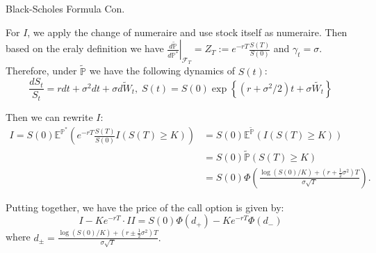 \documentclass{beamer}
\begin{document}
\begin{frame}{Black-Scholes Formula Con.}

    {\footnotesize \footnotesize
    \par For $I$, we apply the change of numeraire and use stock itself as numeraire. Then based on the eraly definition
    we have $\left.\frac{d\tilde{\mathbb{P}}}{d\mathbb{P}^*}\right|_{\mathcal{F}_T} = Z_T :=  e^{-rT}\frac{S(T)}{S(0)}$
    and $\gamma_t = \sigma$. Therefore, under \(\tilde{\mathbb{P}}\) we have the following dynamics of \(S(t)\):
    \[
    \frac{dS_t}{S_t} = rdt + \sigma^2 dt + \sigma \tilde{dW_t},\;
    S(t) = S(0) \exp \left\{ (r + \sigma^2/2) t + \sigma \tilde{W_t} \right\}
    \]
    \par Then we can rewrite $I$:
    \begin{align*}
        I = S(0)\mathbb{E}^{\mathbb{P}^*} \left( e^{-rT} \frac{S(T)}{S(0)} I(S(T) \geq K) \right) &= S(0) \mathbb{E}^{\tilde{\mathbb{P}}} (I(S(T) \geq K)) \\
        &= S(0) \tilde{\mathbb{P}}(S(T) \geq K)\\
       & = S(0) \Phi \left( \frac{\log(S(0)/K) + (r + \frac{1}{2} \sigma^2) T}{\sigma \sqrt{T}} \right).
    \end{align*}
   \par Putting together, we have the price of the call option is given by:
    \[
    I - Ke^{-rT} \cdot II = S(0) \Phi(d_+) - Ke^{-rT} \Phi(d_-)
    \]
where $d_{\pm} = \frac{\log(S(0)/K) + (r \pm \frac{1}{2} \sigma^2) T}{\sigma \sqrt{T}}.$

    }
\end{frame}
\end{document}
